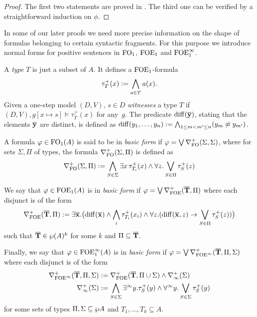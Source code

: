 \begin{proof}
The first two statements are proved in \cite{carr:mode18}. 
The third one can be verified by a straightforward induction on $\phi$. 
\end{proof}

In some of our later proofs we need more precise information on the shape of
formulas belonging to certain syntactic fragments.
For this purpose we introduce normal forms for positive sentences in $\mathrm{FO}_1$, 
$\mathrm{FOE}_1$ and $\mathrm{FOE}^{\infty}_1$. 

\begin{definition}%
\label{def:basicform-ofoe}
\label{def:basicform-ofoei}
A \emph{type} $T$ is just a subset of $A$. It defines a $\mathrm{FOE}_1$-formula 
\[
\tau^{+}_T(x) \mathrel{: =} \bigwedge_{a \in T} a(x).
\]
Given a one-step model $(D,V)$, $s \in D$ \emph{witnesses} a type $T$ if 
$(D,V), g[x\mapsto s] \models \tau^{+}_T(x)$ for any~$g$. 
The predicate $\mathrm{diff}(\overline{{\mathbf{y}}})$, stating that the elements $\overline{{\mathbf{y}}}$ are 
distinct, is defined as $\mathrm{diff}(y_1,\dots,y_n) \mathrel{:=} 
\bigwedge_{1\leq m < m^{\prime} \leq n} (y_m \not\approx y_{m^{\prime}})$.

A formula $\varphi \in \mathrm{FO}_1(A)$ is said to be in \emph{basic form} if $\varphi = 
\bigvee \nabla^+_{\mathrm{FO}}(\Sigma,\Sigma)$, where for sets $\Sigma,\Pi$ of types, 
the formula 
$\nabla^+_{\mathrm{FO}}(\Sigma,\Pi)$ is defined as 
\begin{equation*}%
\posdgbnfofo{\Sigma}{\Pi} \isdef 
\bigwedge_{S \in \Sigma} \exists x\, \tau^{+}_{T_i}(x) 
\land 
\forall z. \bigvee_{S\in \Pi} \tau^{+}_S(z)
\end{equation*}


We say that $\varphi \in \mathrm{FOE}_1(A)$ is in \emph{basic form} if $\varphi = \bigvee 
\nabla^+_{\mathrm{FOE}}(\overline{{\mathbf{T}}},\Pi)$ where each disjunct is of the form
%
\begin{equation*}%
\posdbnfofoe{\vlist{T}}{\Pi} \isdef 
\exists \vlist{x}.\big(\arediff{\vlist{x}} \land \bigwedge_i \tau^{+}_{T_i}(x_i) 
\land 
\forall z.(\arediff{\vlist{x},z} \to \bigvee_{S\in \Pi} \tau^{+}_S(z))\big)
\end{equation*}
%
such that $\overline{{\mathbf{T}}} \in \wp(A)^k$ for some $k$ and $\Pi \subseteq \overline{{\mathbf{T}}}$. 

Finally, we say that $\varphi \in \mathrm{FOE}^{\infty}_1(A)$ is in \emph{basic form} if $\varphi = 
\bigvee \nabla^+_{\mathrm{FOE}^{\infty}}(\overline{{\mathbf{T}}},\Pi,\Sigma)$ where each disjunct is of the 
form
\begin{align*}
   \nabla^+_{\mathrm{FOE}^{\infty}}(\overline{{\mathbf{T}}},\Pi,\Sigma) &\mathrel{:=}
  \nabla^+_{\mathrm{FOE}}(\overline{{\mathbf{T}}},\Pi \cup \Sigma) \land \nabla^+_\infty(\Sigma)
\\ \nabla^+_\infty(\Sigma) &\mathrel{:=} 
   \bigwedge_{S\in\Sigma} \exists^\infty y.\tau^{+}_S(y) \land 
      \forall^\infty y.\bigvee_{S\in\Sigma} \tau^{+}_S(y)
\end{align*}
for some sets of types $\Pi,\Sigma \subseteq \wp A$ and $T_1, \dots, T_k 
\subseteq A$.
\end{definition}

